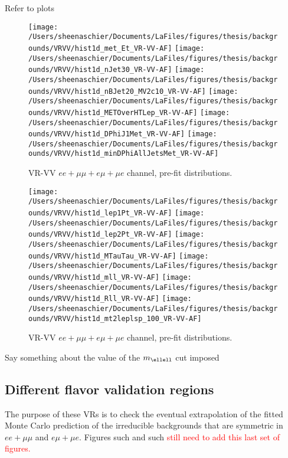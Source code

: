 Refer to plots

\begin{figure}
    \centering
        \texttt{[image: /Users/sheenaschier/Documents/LaFiles/figures/thesis/backgrounds/VRVV/hist1d\_met\_Et\_VR-VV-AF]}
        \texttt{[image: /Users/sheenaschier/Documents/LaFiles/figures/thesis/backgrounds/VRVV/hist1d\_nJet30\_VR-VV-AF]}
        \texttt{[image: /Users/sheenaschier/Documents/LaFiles/figures/thesis/backgrounds/VRVV/hist1d\_nBJet20\_MV2c10\_VR-VV-AF]}
        \texttt{[image: /Users/sheenaschier/Documents/LaFiles/figures/thesis/backgrounds/VRVV/hist1d\_METOverHTLep\_VR-VV-AF]}
        \texttt{[image: /Users/sheenaschier/Documents/LaFiles/figures/thesis/backgrounds/VRVV/hist1d\_DPhiJ1Met\_VR-VV-AF]}
        \texttt{[image: /Users/sheenaschier/Documents/LaFiles/figures/thesis/backgrounds/VRVV/hist1d\_minDPhiAllJetsMet\_VR-VV-AF]}
    \caption{VR-VV $ee+\mu\mu +e\mu + \mu e$ channel, pre-fit distributions.}
    \label{fig:VR-VV-AF-set1vars}
\end{figure} 


\begin{figure}
    \centering
        \texttt{[image: /Users/sheenaschier/Documents/LaFiles/figures/thesis/backgrounds/VRVV/hist1d\_lep1Pt\_VR-VV-AF]}
        \texttt{[image: /Users/sheenaschier/Documents/LaFiles/figures/thesis/backgrounds/VRVV/hist1d\_lep2Pt\_VR-VV-AF]}
        \texttt{[image: /Users/sheenaschier/Documents/LaFiles/figures/thesis/backgrounds/VRVV/hist1d\_MTauTau\_VR-VV-AF]}
        \texttt{[image: /Users/sheenaschier/Documents/LaFiles/figures/thesis/backgrounds/VRVV/hist1d\_mll\_VR-VV-AF]}
        \texttt{[image: /Users/sheenaschier/Documents/LaFiles/figures/thesis/backgrounds/VRVV/hist1d\_Rll\_VR-VV-AF]}
        \texttt{[image: /Users/sheenaschier/Documents/LaFiles/figures/thesis/backgrounds/VRVV/hist1d\_mt2leplsp\_100\_VR-VV-AF]}
    \caption{VR-VV $ee+\mu\mu +e\mu + \mu e$ channel, pre-fit distributions.}
    \label{fig:VR-VV-AF-set3vars}
\end{figure}
Say something about the value of the $m_{\ellell}$ cut imposed
\subsection{Different flavor validation regions}
The purpose of these VRs is to check the eventual extrapolation of the fitted Monte Carlo prediction of the irreducible backgrounds that are symmetric in $ee+\mu\mu$ and $e\mu+\mu e$.  Figures such and such \textcolor{red}{still need to add this last set of figures.}




